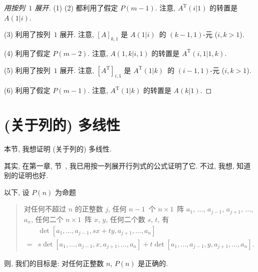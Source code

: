 \begin{proof}[用按列~\(1\) 展开]
    (1) (2)
    都利用了假定 \(P(m-1)\).
    注意, \(A^{\mathrm{T}} (i|1)\)
    的转置是 \(A(1|i)\).

    (3)
    利用了按列~\(1\) 展开.
    注意, \([A]_{k,1}\) 是 \(A(1|i)\)~的
    \((k-1, 1)\)-元
    (\(i, k > 1\)).

    (4)
    利用了假定 \(P(m-2)\).
    注意, \(A({1,k}|{i,1})\)
    的转置是 \(A^{\mathrm{T}} ({i,1}|{1,k})\).

    (5)
    利用了按列~\(1\) 展开.
    注意, \([A^{\mathrm{T}}]_{i,1}\) 是
    \(A^{\mathrm{T}} (1|k)\)~的
    \((i-1, 1)\)-元
    (\(i, k > 1\)).

    (6)
    利用了假定 \(P(m-1)\).
    注意, \(A^{\mathrm{T}} (1|k)\)
    的转置是 \(A(k|1)\).
\end{proof}

\section{(关于列的) 多线性}

本节, 我想证明 (关于列的) 多线性.

其实, 在第一章, 节~,
我已用按一列展开行列式的公式证明了它.
不过, 我想, 知道别的证明也好.



以下, 设 \(P(n)\) 为命题
\begin{quotation}
    对任何不超过 \(n\) 的正整数 \(j\),
    任何 \(n-1\)~个 \(n \times 1\)~阵
    \(a_1\), \(\dots\), \(a_{j-1}\),
    \(a_{j+1}\), \(\dots\), \(a_n\),
    任何二个 \(n \times 1\)~阵 \(x\), \(y\),
    任何二个数 \(s\), \(t\),
    有
    \begin{align*}
             & \det
        {[a_1, \dots, a_{j-1}, sx + ty, a_{j+1}, \dots, a_n]}
        \\
        = {} &
        s
        \det {[a_1, \dots, a_{j-1}, x, a_{j+1}, \dots, a_n]}
        +
        t
        \det {[a_1, \dots, a_{j-1}, y, a_{j+1}, \dots, a_n]}.
    \end{align*}
\end{quotation}
则, 我们的目标是:
对任何正整数 \(n\), \(P(n)\) 是正确的.

